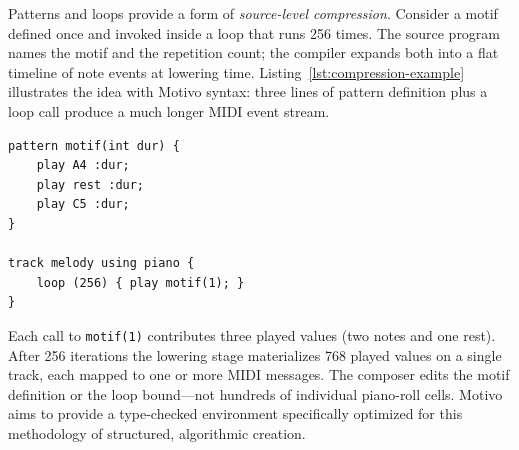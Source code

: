 Patterns and loops provide a form of \textit{source-level compression}.
Consider a motif defined once and invoked inside a loop that runs 256 times.
The source program names the motif and the repetition count; the compiler expands both into a flat timeline of note
events at lowering time.
Listing~\ref{lst:compression-example} illustrates the idea with Motivo syntax: three lines of pattern definition plus
a loop call produce a much longer MIDI event stream.

\begin{lstlisting}[label={lst:compression-example},caption={A compact Motivo program whose lowering expands into many MIDI note events.}]
pattern motif(int dur) {
    play A4 :dur;
    play rest :dur;
    play C5 :dur;
}

track melody using piano {
    loop (256) { play motif(1); }
}
\end{lstlisting}

Each call to \texttt{motif(1)} contributes three played values (two notes and one rest).
After 256 iterations the lowering stage materializes 768 played values on a single track, each mapped to one or more
MIDI messages.
The composer edits the motif definition or the loop bound---not hundreds of individual piano-roll cells.
Motivo aims to provide a type-checked environment specifically optimized for this methodology of structured,
algorithmic creation.
